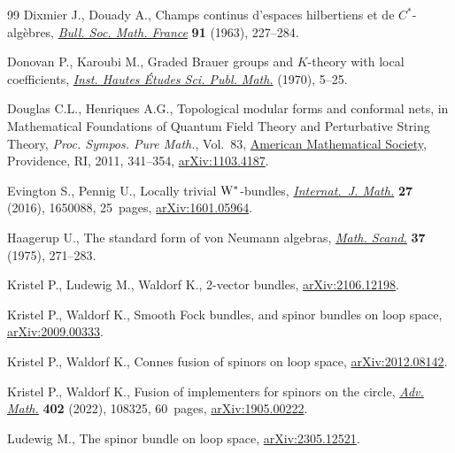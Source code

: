 \documentclass[pdftex]{sigma}
\numberwithin{equation}{section}
\begin{document}
\begin{thebibliography}{99}
Dixmier J., Douady A., Champs continus d'espaces hilbertiens et de
 {$C^*$}-alg\`ebres, \href{https://doi.org/10.24033/bsmf.1596}{\textit{Bull. Soc. Math. France}} \textbf{91} (1963),
 227--284.

Donovan P., Karoubi M., Graded {B}rauer groups and {$K$}-theory with local
 coefficients,  \href{https://doi.org/10.24033/bsmf.1596}{\textit{Inst. Hautes \'Etudes Sci. Publ. Math.}} (1970), 5--25.

Douglas C.L., Henriques A.G., Topological modular forms and conformal nets, in
 Mathematical {F}oundations of {Q}uantum {F}ield {T}heory and {P}erturbative
 {S}tring {T}heory, \textit{Proc. Sympos. Pure Math.}, Vol.~83,  \href{https://doi.org/10.1090/pspum/083/2742433}{American
 Mathematical Society}, Providence, RI, 2011, 341--354, \href{https://arxiv.org/abs/1103.4187}{arXiv:1103.4187}.

Evington S., Pennig U., Locally trivial {${\rm W}^*$}-bundles,
 \href{https://doi.org/10.1142/S0129167X16500889}{\textit{Internat.~J. Math.}} \textbf{27} (2016), 1650088, 25~pages,
 \href{https://arxiv.org/abs/1601.05964}{arXiv:1601.05964}.

Haagerup U., The standard form of von {N}eumann algebras,  \href{https://doi.org/10.7146/math.scand.a-11606}{\textit{Math. Scand.}}
 \textbf{37} (1975), 271--283.

Kristel P., Ludewig M., Waldorf K., 2-vector bundles, \href{https://arxiv.org/abs/2106.12198}{arXiv:2106.12198}.

Kristel P., Waldorf K., Smooth {F}ock bundles, and spinor bundles on loop
 space, \href{https://arxiv.org/abs/2009.00333}{arXiv:2009.00333}.

Kristel P., Waldorf K., Connes fusion of spinors on loop space,
 \href{https://arxiv.org/abs/2012.08142}{arXiv:2012.08142}.

Kristel P., Waldorf K., Fusion of implementers for spinors on the circle,
 \href{https://doi.org/10.1016/j.aim.2022.108325}{\textit{Adv. Math.}} \textbf{402} (2022), 108325, 60~pages,
 \href{https://arxiv.org/abs/1905.00222}{arXiv:1905.00222}.

Ludewig M., The spinor bundle on loop space, \href{https://arxiv.org/abs/2305.12521}{arXiv:2305.12521}.


\end{thebibliography}
\end{document}
